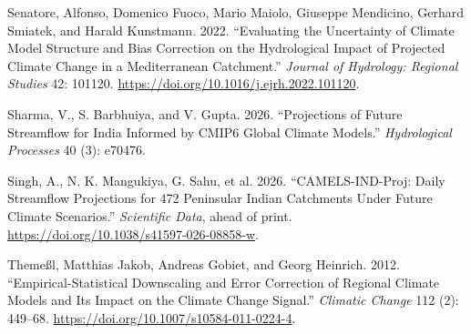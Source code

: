 \documentclass[
  11pt,
]{article}
\newlength{\cslhangindent}
\newenvironment{CSLReferences}[2] %
 {\begin{list}{}{%
  \setlength{\itemindent}{0pt}
  \setlength{\leftmargin}{0pt}
  \setlength{\parsep}{0pt}
  \ifodd #1
   \setlength{\leftmargin}{\cslhangindent}
   \setlength{\itemindent}{-1\cslhangindent}
  \fi
  \setlength{\itemsep}{#2\baselineskip}}}
 {\end{list}}
\begin{document}
\begin{CSLReferences}{1}{1}
Senatore, Alfonso, Domenico Fuoco, Mario Maiolo, Giuseppe Mendicino,
Gerhard Smiatek, and Harald Kunstmann. 2022. {``Evaluating the
Uncertainty of Climate Model Structure and Bias Correction on the
Hydrological Impact of Projected Climate Change in a {Mediterranean}
Catchment.''} \emph{Journal of Hydrology: Regional Studies} 42: 101120.
\url{https://doi.org/10.1016/j.ejrh.2022.101120}.

Sharma, V., S. Barbhuiya, and V. Gupta. 2026. {``Projections of Future
Streamflow for {India} Informed by {CMIP6} Global Climate Models.''}
\emph{Hydrological Processes} 40 (3): e70476.

{Singh, A., N. K. Mangukiya, G. Sahu, et al.} 2026.
{``{CAMELS-IND-Proj}: Daily Streamflow Projections for 472 {Peninsular
Indian} Catchments Under Future Climate Scenarios.''} \emph{Scientific
Data}, ahead of print. \url{https://doi.org/10.1038/s41597-026-08858-w}.

Themeßl, Matthias Jakob, Andreas Gobiet, and Georg Heinrich. 2012.
{``Empirical-Statistical Downscaling and Error Correction of Regional
Climate Models and Its Impact on the Climate Change Signal.''}
\emph{Climatic Change} 112 (2): 449--68.
\url{https://doi.org/10.1007/s10584-011-0224-4}.

\end{CSLReferences}
\end{document}
